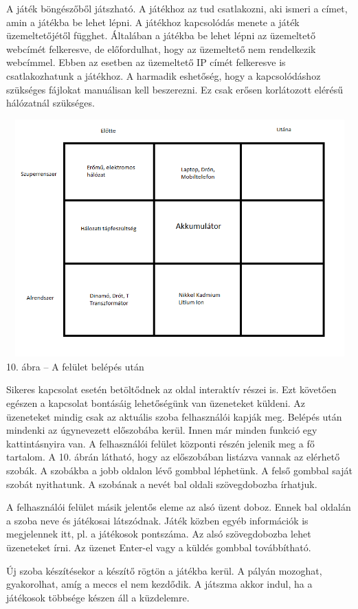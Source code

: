 \documentclass[]{article}
\begin{document}
A játék böngészőből játszható. A játékhoz az tud csatlakozni, aki ismeri
a címet, amin a játékba be lehet lépni. A játékhoz kapcsolódás menete a
játék üzemeltetőjétől függhet. Általában a játékba be lehet lépni az
üzemeltető webcímét felkeresve, de előfordulhat, hogy az üzemeltető nem
rendelkezik webcímmel. Ebben az esetben az üzemeltető IP címét
felkeresve is csatlakozhatunk a játékhoz. A harmadik eshetőség, hogy a
kapcsolódáshoz szükséges fájlokat manuálisan kell beszerezni. Ez csak
erősen korlátozott elérésű hálózatnál szükséges.

\includegraphics[width=5.90551in,height=3.59853in]{media/image7.png}10.
ábra -- A felület belépés után

Sikeres kapcsolat esetén betöltődnek az oldal interaktív részei is. Ezt
követően egészen a kapcsolat bontásáig lehetőségünk van üzeneteket
küldeni. Az üzeneteket mindig csak az aktuális szoba felhasználói kapják
meg. Belépés után mindenki az úgynevezett előszobába kerül. Innen már
minden funkció egy kattintásnyira van. A felhasználói felület központi
részén jelenik meg a fő tartalom. A 10. ábrán látható, hogy az
előszobában listázva vannak az elérhető szobák. A szobákba a jobb
oldalon lévő gombbal léphetünk. A felső gombbal saját szobát nyithatunk.
A szobának a nevét bal oldali szövegdobozba írhatjuk.

A felhasználói felület másik jelentős eleme az alsó üzent doboz. Ennek
bal oldalán a szoba neve és játékosai látszódnak. Játék közben egyéb
információk is megjelennek itt, pl. a játékosok pontszáma. Az alsó
szövegdobozba lehet üzeneteket írni. Az üzenet Enter-el vagy a küldés
gombbal továbbítható.

Új szoba készítésekor a készítő rögtön a játékba kerül. A pályán
mozoghat, gyakorolhat, amíg a meccs el nem kezdődik. A játszma akkor
indul, ha a játékosok többsége készen áll a küzdelemre.
\end{document}
